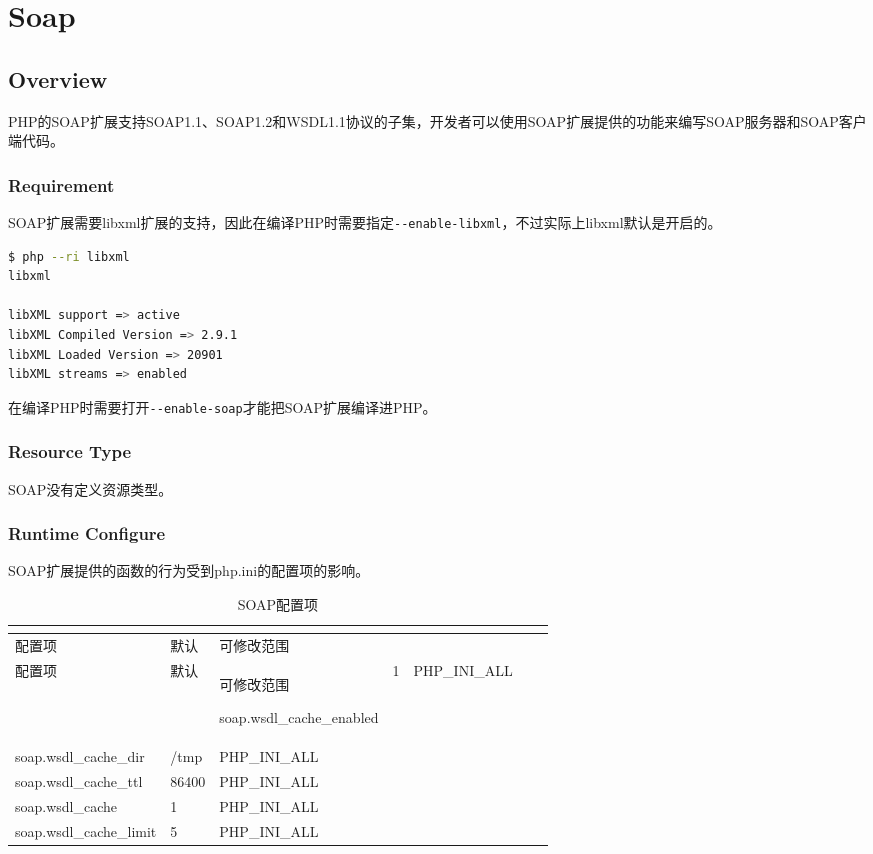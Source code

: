 \part{Soap}


\chapter{Overview}

PHP的SOAP扩展支持SOAP1.1、SOAP1.2和WSDL1.1协议的子集，开发者可以使用SOAP扩展提供的功能来编写SOAP服务器和SOAP客户端代码。


\section{Requirement}

SOAP扩展需要libxml扩展的支持，因此在编译PHP时需要指定\texttt{-\/-enable-libxml}，不过实际上libxml默认是开启的。

\begin{lstlisting}[language=bash]
$ php --ri libxml
libxml

libXML support => active
libXML Compiled Version => 2.9.1
libXML Loaded Version => 20901
libXML streams => enabled
\end{lstlisting}

在编译PHP时需要打开\texttt{-\/-enable-soap}才能把SOAP扩展编译进PHP。


\section{Resource Type}

SOAP没有定义资源类型。


\section{Runtime Configure}


SOAP扩展提供的函数的行为受到php.ini的配置项的影响。


\begin{longtable}{|m{150pt}|m{40pt}|m{120pt}|}
\tabularnewline\hline
配置项&默认&可修改范围
\endhead

\caption{SOAP配置项}\\
\hline
配置项&默认&可修改范围
\endfirsthead

\endfoot

\endlastfoot
\hline
soap.wsdl\_cache\_enabled	&1		&PHP\_INI\_ALL	\\
\hline
soap.wsdl\_cache\_dir		&/tmp	&PHP\_INI\_ALL	\\
\hline
soap.wsdl\_cache\_ttl		&86400	&PHP\_INI\_ALL	\\
\hline
soap.wsdl\_cache			&1		&PHP\_INI\_ALL	\\
\hline
soap.wsdl\_cache\_limit		&5		&PHP\_INI\_ALL\\
\hline
\end{longtable}

